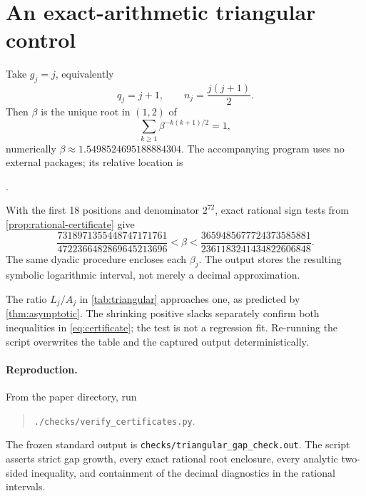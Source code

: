 \section{An exact-arithmetic triangular control}
\label{sec:computation}

Take $g_j=j$, equivalently
\[
 q_j=j+1,\qquad n_j=\frac{j(j+1)}2.
\]
Then $\beta$ is the unique root in $(1,2)$ of
\[
 \sum_{k\geq1}\beta^{-k(k+1)/2}=1,
\]
numerically $\beta\approx1.5498524695188884304$.  The accompanying program uses no external packages; its relative location is
\begin{center}
.
\end{center}
With the first 18 positions and denominator $2^{72}$, exact rational sign tests from \cref{prop:rational-certificate} give
\[
 \frac{7318971355448747171761}{4722366482869645213696}
 <\beta<
 \frac{3659485677724373585881}{2361183241434822606848}.
\]
The same dyadic procedure encloses each $\beta_j$.  The output stores the resulting symbolic logarithmic interval, not merely a decimal approximation.

\begin{table}[H]
\centering
\small

\caption{Triangular-position control.  Here $A_j=\beta^{-n_{j+1}}/(\beta D_\beta)$.  The two slack columns report the relative distances from $L_j$ to the lower and upper analytic bounds in \eqref{eq:certificate}.  The analytic values are evaluated at high precision only after a separate exact rational root enclosure.  Unrounded data and exact rational log-ratio endpoints are stored in the accompanying JSON file.}
\label{tab:triangular}
\end{table}

The ratio $L_j/A_j$ in \cref{tab:triangular} approaches one, as predicted by \cref{thm:asymptotic}.  The shrinking positive slacks separately confirm both inequalities in \eqref{eq:certificate}; the test is not a regression fit.  Re-running the script overwrites the table and the captured output deterministically.

\paragraph{Reproduction.}
From the paper directory, run
\begin{quote}
\texttt{./checks/verify\_certificates.py}.
\end{quote}
The frozen standard output is \texttt{checks/triangular\_gap\_check.out}.  The script asserts strict gap growth, every exact rational root enclosure, every analytic two-sided inequality, and containment of the decimal diagnostics in the rational intervals.
